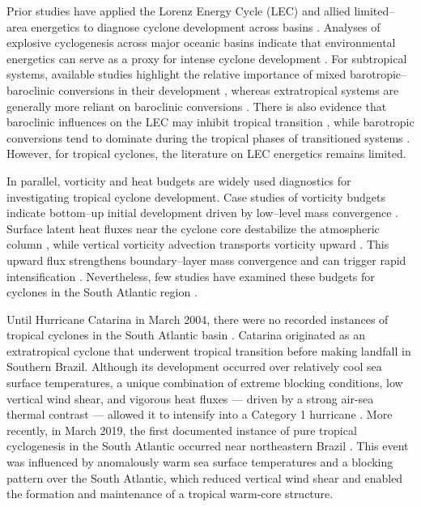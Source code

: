 \documentclass[pdflatex,sn-chicago]{sn-jnl}%
\theoremstyle{plain}
\theoremstyle{definition}
\theoremstyle{remark}
\theoremstyle{definition}
\begin{document}
Prior studies have applied the Lorenz Energy Cycle (LEC) and allied limited–area energetics to diagnose cyclone development across basins \citep[e.g.,][]{brennan1980zonal,smith1980energetics,michaelides1987limited,michaelides1992spatial,bulic2006limited,pezza2010environmental}. Analyses of explosive cyclogenesis across major oceanic basins indicate that environmental energetics can serve as a proxy for intense cyclone development \citep{black2013universal}. For subtropical systems, available studies highlight the relative importance of mixed barotropic–baroclinic conversions in their development \citep{dias2013synoptic,pezza2014large,cavicchia2018energetics}, whereas extratropical systems are generally more reliant on baroclinic conversions \citep{dias2011energy,black2013universal}. There is also evidence that baroclinic influences on the LEC may inhibit tropical transition \citep{dias2013synoptic}, while barotropic conversions tend to dominate during the tropical phases of transitioned systems \citep{veiga2008analysis}. However, for tropical cyclones, the literature on LEC energetics remains limited.

In parallel, vorticity and heat budgets are widely used diagnostics for investigating tropical cyclone development. Case studies of vorticity budgets indicate bottom–up initial development driven by low–level mass convergence \citep{montgomery2010coarse,wu2022examining}. Surface latent heat fluxes near the cyclone core destabilize the atmospheric column \citep{fang2019thermodynamic,vanniere2020moisture}, while vertical vorticity advection transports vorticity upward \citep{desrosiers2022vertical,wu2022examining}. This upward flux strengthens boundary–layer mass convergence and can trigger rapid intensification \citep{raymond2011vorticity}. Nevertheless, few studies have examined these budgets for cyclones in the South Atlantic region \citep[e.g.,][]{dutra2017structure,silva2022ciclones}.

Until Hurricane Catarina in March 2004, there were no recorded instances of tropical cyclones in the South Atlantic basin \citep{pezza2005first}. Catarina originated as an extratropical cyclone that underwent tropical transition before making landfall in Southern Brazil. Although its development occurred over relatively cool sea surface temperatures, a unique combination of extreme blocking conditions, low vertical wind shear, and vigorous heat fluxes — driven by a strong air-sea thermal contrast — allowed it to intensify into a Category 1 hurricane \citep{mctaggart2006analysis,pezza2009climate,vianna2010interactions,pereira2010new}. More recently, in March 2019, the first documented instance of pure tropical cyclogenesis in the South Atlantic occurred near northeastern Brazil \citep{reboita2021iba}. This event was influenced by anomalously warm sea surface temperatures and a blocking pattern over the South Atlantic, which reduced vertical wind shear and enabled the formation and maintenance of a tropical warm-core structure.
\end{document}
